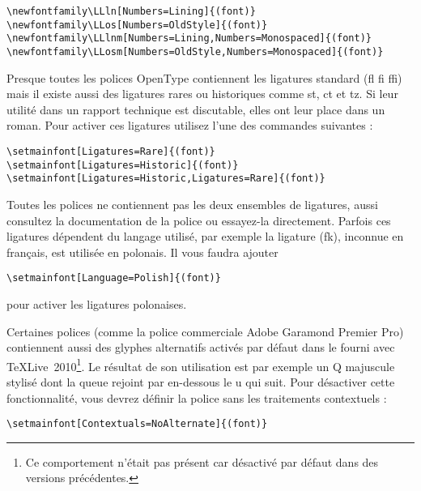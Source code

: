 \begin{code}
\begin{verbatim}
\newfontfamily\LLln[Numbers=Lining]{(font)}
\newfontfamily\LLos[Numbers=OldStyle]{(font)}
\newfontfamily\LLlnm[Numbers=Lining,Numbers=Monospaced]{(font)}
\newfontfamily\LLosm[Numbers=OldStyle,Numbers=Monospaced]{(font)}
\end{verbatim}
\end{code}

Presque toutes les polices OpenType contiennent les ligatures standard
(fl fi ffi) mais il existe aussi des ligatures rares ou historiques
comme st, ct et tz. Si leur utilité dans un rapport technique est
discutable, elles ont leur place dans un roman. Pour activer ces
ligatures utilisez l'une des commandes suivantes :

\begin{code}
\begin{verbatim}
\setmainfont[Ligatures=Rare]{(font)}
\setmainfont[Ligatures=Historic]{(font)}
\setmainfont[Ligatures=Historic,Ligatures=Rare]{(font)}
\end{verbatim}
\end{code}

Toutes les polices ne contiennent pas les deux ensembles de ligatures,
aussi consultez la documentation de la police ou essayez-la
directement. Parfois ces ligatures dépendent du langage utilisé, par
exemple la ligature (fk), inconnue en français, est utilisée en
polonais. Il vous faudra ajouter
\begin{code}
\begin{verbatim}
\setmainfont[Language=Polish]{(font)}
\end{verbatim}
\end{code}
pour activer les ligatures polonaises.

Certaines polices (comme la police commerciale Adobe Garamond Premier
Pro) contiennent aussi des glyphes alternatifs activés par défaut dans
le  fourni avec \TeX Live~2010\footnote{Ce
  comportement n'était pas présent car désactivé par défaut dans des
  versions précédentes.}. Le résultat de son utilisation est par
exemple un \og Q \fg majuscule stylisé dont la queue rejoint par
en-dessous le \og u \fg qui suit. Pour désactiver cette fonctionnalité,
vous devrez définir la police sans les traitements contextuels :

\begin{code}
\begin{verbatim}
\setmainfont[Contextuals=NoAlternate]{(font)}
\end{verbatim}
\end{code}

